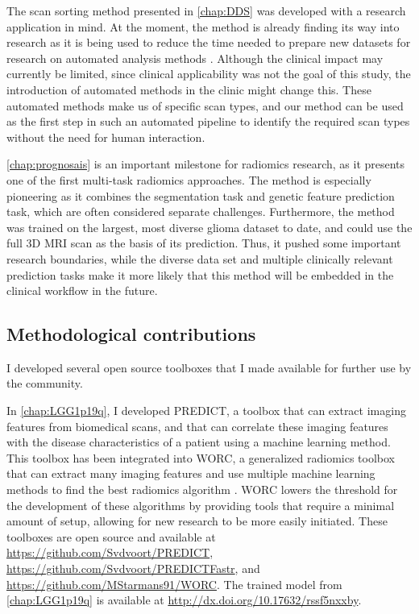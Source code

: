 The scan sorting method presented in \cref{chap:DDS} was developed with a research application in mind.
At the moment, the method is already finding its way into research as it is being used to reduce the time needed to prepare new datasets for research on automated analysis methods \autocite{garderen2020automaticanalysis}.
Although the clinical impact may currently be limited, since clinical applicability was not the goal of this study, the introduction of automated methods in the clinic might change this.
These automated methods make us of specific scan types, and our method can be used as the first step in such an automated pipeline to identify the required scan types without the need for human interaction.

\cref{chap:prognosais} is an important milestone for radiomics research, as it presents one of the first multi-task radiomics approaches.
The method is especially pioneering as it combines the segmentation task and genetic feature prediction task, which are often considered separate challenges.
Furthermore, the method was trained on the largest, most diverse glioma dataset to date, and could use the full 3D \gls{MRI} scan as the basis of its prediction.
Thus, it pushed some important research boundaries, while the diverse data set and multiple clinically relevant prediction tasks make it more likely that this method will be embedded in the clinical workflow in the future.


\subsection{Methodological contributions}

I developed several open source toolboxes that I made available for further use by the community.

In \cref{chap:LGG1p19q}, I developed PREDICT, a toolbox that can extract imaging features from biomedical scans, and that can correlate these imaging features with the disease characteristics of a patient using a machine learning method.
This toolbox has been integrated into WORC, a generalized radiomics toolbox that can extract many imaging features and use multiple machine learning methods to find the best radiomics algorithm \autocite{mstarmans2020worc}.
WORC lowers the threshold for the development of these algorithms by providing tools that require a minimal amount of setup, allowing for new research to be more easily initiated.
These toolboxes are open source and available at \url{https://github.com/Svdvoort/PREDICT}, \url{https://github.com/Svdvoort/PREDICTFastr}, and \url{https://github.com/MStarmans91/WORC}.
The trained model from \cref{chap:LGG1p19q} is available at \url{http://dx.doi.org/10.17632/rssf5nxxby}.

